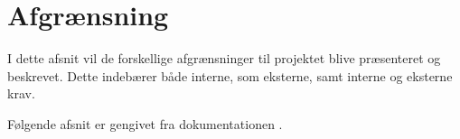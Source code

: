 \section{Afgrænsning}

I dette afsnit vil de forskellige afgrænsninger til projektet blive præsenteret og beskrevet. Dette indebærer både interne, som eksterne, samt interne og eksterne krav.

Følgende afsnit er gengivet fra dokumentationen \cite{issue-statement}.